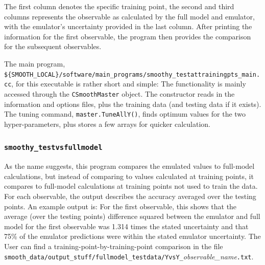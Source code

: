 \documentclass[UserManual.tex]{subfiles}
\begin{document}
\begin{sloppypar}
The first column denotes the specific training point, the second and third columns represents the observable as calculated by the full model and emulator, with the emulator's uncertainty provided in the last column. After printing the information for the first observable, the program then provides the comparison for the subsequent observables.

The main program,\\{\tt \$\{SMOOTH\_LOCAL\}/software/main\_programs/smoothy\_testattrainingpts\_main.cc}, for this executable is rather short and simple:
\vspace*{-8pt}
The functionality is mainly accessed through the {\tt CSmoothMaster} object. The constructor reads in the information and options files, plus the training data (and testing data if it exists). The tuning command, {\tt master.TuneAllY()}, finds optimum values for the two hyper-parameters, plus stores a few arrays for quicker calculation.

\subsubsection{{\tt smoothy\_testvsfullmodel}}
As the name suggests, this program compares the emulated values to full-model calculations, but instead of comparing to values calculated at training points, it compares to full-model calculations at training points not used to train the data.
For each observable, the output describes the accuracy averaged over the testing points. An example output is:
\vspace*{-8pt}{\tt \begin{Verbatim}[commandchars=\\\{\}]
% \textcolor{darkred}{smoothy_testvsfullmodel}
 iY=0: <(Y-Yreal)^2>/SigmaY^2_emulator=1.313787
 percent < 1 sigma = 75.000000
 iY=1: <(Y-Yreal)^2>/SigmaY^2_emulator=1.304912
 percent < 1 sigma = 69.642857
 .
\end{Verbatim}
}\vspace*{-8pt}
For the first observable, this shows that the average (over the testing points) difference squared between the emulator and full model for the first observable was 1.314 times the stated uncertainty and that 75\% of the emulator predictions were within the stated emulator uncertainty. The User can find a training-point-by-training-point comparison in the file {\tt smooth\_data/output\_stuff/fullmodel\_testdata/YvsY\_}{\it observable\_name}{\tt.txt}.


\end{sloppypar}
\end{document}
